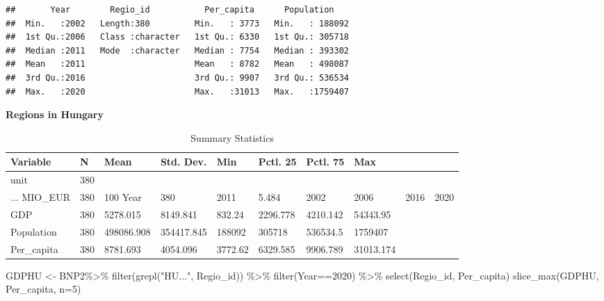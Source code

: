 \documentclass[
]{article}
\newenvironment{Shaded}{\begin{snugshade}}{\end{snugshade}}
\newcommand{\AttributeTok}[1]{\textcolor[rgb]{0.77,0.63,0.00}{#1}}
\newcommand{\DecValTok}[1]{\textcolor[rgb]{0.00,0.00,0.81}{#1}}
\newcommand{\FunctionTok}[1]{\textcolor[rgb]{0.00,0.00,0.00}{#1}}
\newcommand{\NormalTok}[1]{#1}
\newcommand{\OtherTok}[1]{\textcolor[rgb]{0.56,0.35,0.01}{#1}}
\newcommand{\SpecialCharTok}[1]{\textcolor[rgb]{0.00,0.00,0.00}{#1}}
\newcommand{\StringTok}[1]{\textcolor[rgb]{0.31,0.60,0.02}{#1}}
\begin{document}
\begin{verbatim}
##       Year        Regio_id           Per_capita      Population     
##  Min.   :2002   Length:380         Min.   : 3773   Min.   : 188092  
##  1st Qu.:2006   Class :character   1st Qu.: 6330   1st Qu.: 305718  
##  Median :2011   Mode  :character   Median : 7754   Median : 393302  
##  Mean   :2011                      Mean   : 8782   Mean   : 498087  
##  3rd Qu.:2016                      3rd Qu.: 9907   3rd Qu.: 536534  
##  Max.   :2020                      Max.   :31013   Max.   :1759407
\end{verbatim}

\textbf{Regions in Hungary}

\begin{table}

\caption{\label{tab:unnamed-chunk-8}Summary Statistics}
\centering
\begin{tabular}[t]{llllllll}
\toprule
Variable & N & Mean & Std. Dev. & Min & Pctl. 25 & Pctl. 75 & Max\\
\midrule
unit & 380 &  &  &  &  &  & \\
... MIO_EUR & 380 & 100%
Year & 380 & 2011 & 5.484 & 2002 & 2006 & 2016 & 2020\\
GDP & 380 & 5278.015 & 8149.841 & 832.24 & 2296.778 & 4210.142 & 54343.95\\
Population & 380 & 498086.908 & 354417.845 & 188092 & 305718 & 536534.5 & 1759407\\
\addlinespace
Per_capita & 380 & 8781.693 & 4054.096 & 3772.62 & 6329.585 & 9906.789 & 31013.174\\
\bottomrule
\end{tabular}
\end{table}

\begin{Shaded}
\begin{Highlighting}[]
\NormalTok{GDPHU }\OtherTok{\textless{}{-}}\NormalTok{ BNP2}\SpecialCharTok{\%\textgreater{}\%}
  \FunctionTok{filter}\NormalTok{(}\FunctionTok{grepl}\NormalTok{(}\StringTok{"HU..."}\NormalTok{, Regio\_id)) }\SpecialCharTok{\%\textgreater{}\%}
  \FunctionTok{filter}\NormalTok{(Year}\SpecialCharTok{==}\DecValTok{2020}\NormalTok{) }\SpecialCharTok{\%\textgreater{}\%}
  \FunctionTok{select}\NormalTok{(Regio\_id, Per\_capita)}
\FunctionTok{slice\_max}\NormalTok{(GDPHU, Per\_capita, }\AttributeTok{n=}\DecValTok{5}\NormalTok{)}
\end{Highlighting}
\end{Shaded}
\end{document}
